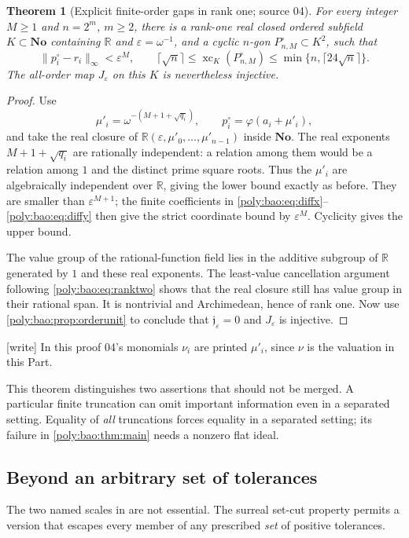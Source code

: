 \documentclass[11pt,a4paper]{article}
\numberwithin{equation}{section}
\newtheorem{theorem}{Theorem}[section]
\theoremstyle{plain}
\newcommand{\wtag}{\textup{[write]}}%
\newcommand{\No}{\mathbf{No}}
\newcommand{\R}{\mathbb R}
\newcommand{\eps}{\varepsilon}
\newcommand{\xc}{\operatorname{xc}}
\newcommand{\ph}{\varphi}
\newcommand{\JJ}{\mathfrak j}
\begin{document}
\begin{theorem}[Explicit finite-order gaps in rank one; source 04]\label{poly:bao:thm:rankone}
For every integer $M\geq1$ and $n=2^m$, $m\geq2$, there is a rank-one
real closed ordered subfield $K\subset\No$ containing $\R$ and
$\eps=\omega^{-1}$, and a cyclic $n$-gon $P^\circ_{n,M}\subset K^2$, such that
\[
 \|p^\circ_i-r_i\|_\infty<\eps^M,\qquad
 \lceil\sqrt n\rceil\leq\xc_K(P^\circ_{n,M})
 \leq\min\{n,\lceil24\sqrt n\rceil\}.
\]
The all-order map $J_\eps$ on this $K$ is nevertheless injective.
\end{theorem}
\begin{proof}
Use
\[
 \mu'_i=\omega^{-(M+1+\sqrt{q_i})},\qquad
 p^\circ_i=\ph(a_i+\mu'_i),
\]
and take the real closure of $\R(\eps,\mu'_0,\ldots,\mu'_{n-1})$ inside
$\No$. The real exponents $M+1+\sqrt{q_i}$ are rationally independent:
a relation among them would be a relation among $1$ and the distinct
prime square roots. Thus the $\mu'_i$ are algebraically independent over
$\R$, giving the lower bound exactly as before. They are smaller than
$\eps^{M+1}$; the finite coefficients in \eqref{poly:bao:eq:diffx}--\eqref{poly:bao:eq:diffy} then
give the strict coordinate bound by $\eps^M$. Cyclicity gives the upper
bound.

The value group of the rational-function field lies in the additive
subgroup of $\R$ generated by $1$ and these real exponents. The
least-value cancellation argument following \eqref{poly:bao:eq:ranktwo} shows
that the real closure still has value group in their rational span.
It is nontrivial and Archimedean, hence of rank one. Now use
\cref{poly:bao:prop:orderunit} to conclude that $\JJ_\eps=0$ and $J_\eps$ is injective.
\end{proof}

\wtag{} In this proof 04's monomials $\nu_i$ are printed $\mu'_i$, since
$\nu$ is the valuation in this Part.

This theorem distinguishes two assertions that should not be merged.
A particular finite truncation can omit important information even in a
separated setting. Equality of \emph{all} truncations forces equality in a
separated setting; its failure in \cref{poly:bao:thm:main} needs a nonzero flat
ideal.

\subsection{Beyond an arbitrary set of tolerances}
The two named scales in  are not essential. The surreal
set-cut property permits a version that escapes every member of any
prescribed \emph{set} of positive tolerances.
\end{document}
